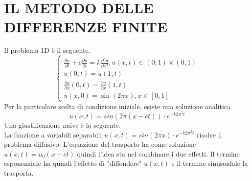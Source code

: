 \documentclass[italian]{article}
\begin{document}
\section{IL METODO DELLE DIFFERENZE FINITE}
Il problema 1D è il seguente.
$$\begin{cases}
\frac{\partial u}{\partial t} + c \frac{\partial u}{\partial t} = k \frac{\partial ^ 2 u}{\partial x ^ 2}, u(x,t) \in (0,1) \times (0,1)
\\ u(0,t) = u(1,t)
\\ \frac{\partial u}{\partial x}(0,t) = \frac{\partial u}{\partial x}(1,t)
\\ u(x,0) = \sin (2 \pi x), x \in [0,1]
\end{cases}$$
Per la particolare scelta di condizione iniziale, esiste una soluzione analitica
$$u(x,t) = sin(2 \pi (x-ct)) \cdot e ^ {-k {2 \pi}^{2} t}$$
Una giustificazione naive è la seguente.\\
La funzione a variabili separabili $u(x,t) = sin(2 \pi x) \cdot e ^ {-k {2 \pi}^{2} t}$ risolve il problema diffusivo. L'equazione del trasporto ha come soluzione $u(x,t) = u_0 (x-ct)$ quindi l'idea sta nel combinare i due effetti. Il termine esponenziale ha quindi l'effetto di "diffondere" $u(x,t)$ e il termine sinusoidale la trasporta. 
\bigskip
\end{document}
